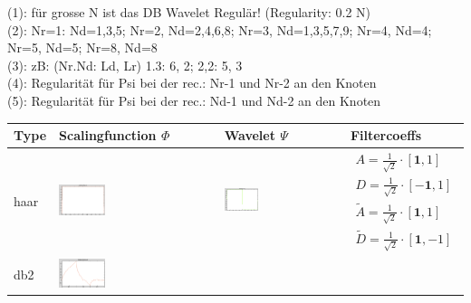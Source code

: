 \vspace{0.2cm}

(1): für grosse N ist das DB Wavelet Regulär! (Regularity: 0.2 N)\\
(2): Nr=1: Nd=1,3,5; Nr=2, Nd=2,4,6,8; Nr=3, Nd=1,3,5,7,9; Nr=4, Nd=4; Nr=5, Nd=5; Nr=8, Nd=8\\
(3): zB: (Nr.Nd: Ld, Lr) 1.3: 6, 2; 2,2: 5, 3 \\
(4): Regularität für Psi bei der rec.: Nr-1 und Nr-2 an den Knoten\\
(5): Regularität für Psi bei der rec.: Nd-1 und Nd-2 an den Knoten

\vspace{0.2cm}

\renewcommand{\arraystretch}{0.1}
\begin{tabular}{l||m{}|m{}|m{}}
	\textbf{Type} & \textbf{Scalingfunction} $\Phi$ & \textbf{Wavelet} $\Psi$ & \textbf{Filtercoeffs}\\
	\hline
	haar & 
	\includegraphics[width=0.3\textwidth]{content/HaarPhi.png} &
	\includegraphics[width=0.3\textwidth]{content/HaarPsi.png} & 
	\begin{align}
		A = \frac{1}{\sqrt{2}} \cdot [\mathbf{1}, 1] \nonumber\\ 
		D = \frac{1}{\sqrt{2}} \cdot [\mathbf{-1}, 1] \nonumber\\
		\tilde{A} = \frac{1}{\sqrt{2}} \cdot [\mathbf{1}, 1] \nonumber\\ 
		\tilde{D} = \frac{1}{\sqrt{2}} \cdot [\mathbf{1}, -1] \nonumber
	\end{align} \\
	\hline
	db2 &
	\includegraphics[width=0.3\textwidth]{content/Db2Phi.png} &

\end{tabular}
